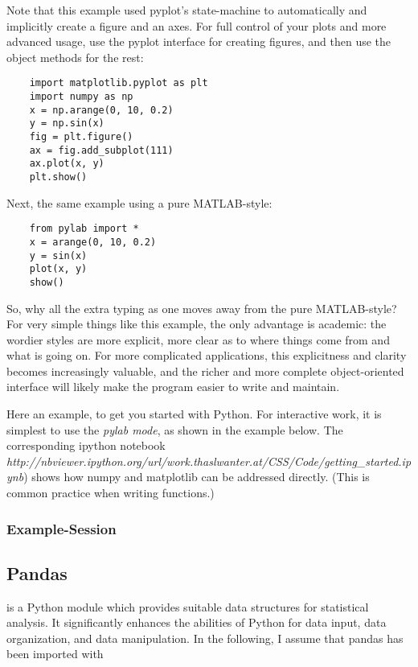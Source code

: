 Note that this example used pyplot's state-machine to automatically and implicitly create a figure and an axes. For full control of your plots and more advanced usage, use the pyplot interface for creating figures, and then use the object methods for the rest:

\begin{lstlisting}
    import matplotlib.pyplot as plt
    import numpy as np
    x = np.arange(0, 10, 0.2)
    y = np.sin(x)
    fig = plt.figure()
    ax = fig.add_subplot(111)
    ax.plot(x, y)
    plt.show()
\end{lstlisting}

Next, the same example using a pure MATLAB-style:

\begin{lstlisting}
    from pylab import *
    x = arange(0, 10, 0.2)
    y = sin(x)
    plot(x, y)
    show()
\end{lstlisting}

So, why all the extra typing as one moves away from the pure MATLAB-style? For very simple things like this example, the only advantage is academic: the wordier styles are more explicit, more clear as to where things come from and what is going on. For more complicated applications, this explicitness and clarity becomes increasingly valuable, and the richer and more complete object-oriented interface will likely make the program easier to write and maintain.

Here an example, to get you started with Python. For interactive work, it is
simplest to use the \emph{pylab mode}, as shown in the example below. The corresponding ipython
notebook
 \emph{http://nbviewer.ipython.org/url/work.thaslwanter.at/CSS/Code/getting\_started.ipynb})
shows how numpy and matplotlib can be addressed directly. (This is common
practice when writing functions.)

\subsubsection{Example-Session}

\subsection{Pandas}

\cite{pandas} is a Python module which provides suitable data structures for
statistical analysis. It significantly enhances the abilities of Python for
data input, data organization, and data manipulation. In the following, I assume
that pandas has been imported with


